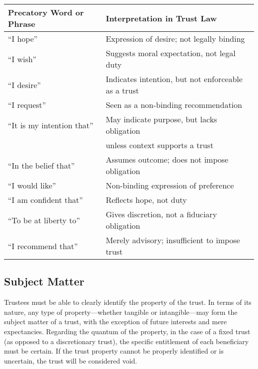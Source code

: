 \begin{tabular}{@{}ll@{}}
\hline
\textbf{Precatory Word or Phrase} & \textbf{Interpretation in Trust Law} \\
\hline
``I hope''                    & Expression of desire; not legally binding \\
``I wish''                   & Suggests moral expectation, not legal duty \\
``I desire''                 & Indicates intention, but not enforceable as a trust \\
``I request''                & Seen as a non-binding recommendation \\
``It is my intention that''  & May indicate purpose, but lacks obligation \\
{}& unless context supports a trust \\
``In the belief that''       & Assumes outcome; does not impose obligation \\
``I would like''             & Non-binding expression of preference \\
``I am confident that''      & Reflects hope, not duty \\
``To be at liberty to''      & Gives discretion, not a fiduciary obligation \\
``I recommend that''         & Merely advisory; insufficient to impose trust \\
\hline
\end{tabular}

\subsection*{Subject Matter}
Trustees must be able to clearly identify the property of the trust. In terms of its nature, any type of property—whether tangible or intangible—may form the subject matter of a trust, with the exception of future interests and mere expectancies. Regarding the quantum of the property, in the case of a fixed trust (as opposed to a discretionary trust), the specific entitlement of each beneficiary must be certain. If the trust property cannot be properly identified or is uncertain, the trust will be considered void.

